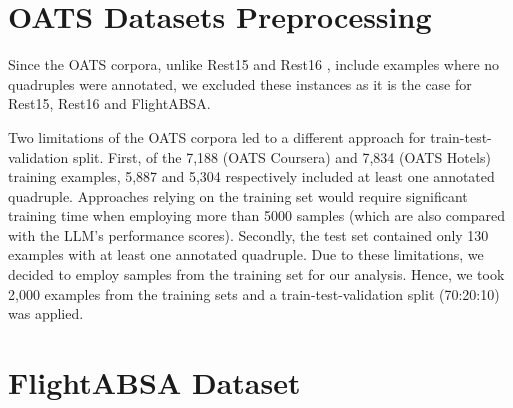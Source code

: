\appendix
\newpage
\section{OATS Datasets Preprocessing}
\label{appendix:oats-dataset}
Since the OATS corpora, unlike Rest15 and Rest16 \citet{zhang2021aspect}, include examples where no quadruples were annotated, we excluded these instances as it is the case for Rest15, Rest16 and FlightABSA. 

Two limitations of the OATS corpora led to a different approach for train-test-validation split. First, of the 7,188 (OATS Coursera) and 7,834 (OATS Hotels) training examples, 5,887 and 5,304 respectively included at least one annotated quadruple. Approaches relying on the training set would require significant training time when employing more than 5000 samples (which are also compared with the LLM's performance scores). Secondly, the test set contained only 130 examples with at least one annotated quadruple. Due to these limitations, we decided to employ samples from the training set for our analysis. Hence, we took 2,000 examples from the training sets and a train-test-validation split (70:20:10) was applied. %

\section{FlightABSA Dataset}
\label{appendix:flightabsa}


